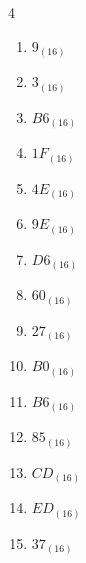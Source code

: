 \begin{multicols}{4}
\begin{enumerate}
        \phantom{$=98$}

  \item $9_{(16)}$

        \phantom{$=9$}

  \item $3_{(16)}$

        \phantom{$=3$}

  \item $B6_{(16)}$

        \phantom{$=182$}

  \item $1F_{(16)}$

        \phantom{$=31$}

  \item $4E_{(16)}$

        \phantom{$=78$}

  \item $9E_{(16)}$

        \phantom{$=158$}

  \item $D6_{(16)}$

        \phantom{$=214$}

  \item $60_{(16)}$

        \phantom{$=96$}

  \item $27_{(16)}$

        \phantom{$=39$}

  \item $B0_{(16)}$

        \phantom{$=176$}

\columnbreak %

  \item $B6_{(16)}$

        \phantom{$=182$}

  \item $85_{(16)}$

        \phantom{$=133$}

  \item $CD_{(16)}$

        \phantom{$=205$}

  \item $ED_{(16)}$

        \phantom{$=237$}

  \item $37_{(16)}$

        \phantom{$=55$}


\end{enumerate}
\end{multicols}
